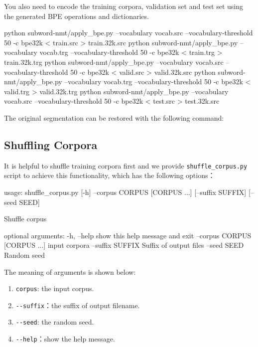 \documentclass{article}
\begin{document}
You also need to encode the training corpora, validation set and test set using the generated BPE operations and dictionaries.
\begin{everbatim}
  python subword-nmt/apply_bpe.py
    --vocabulary vocab.src
    --vocabulary-threshold 50
    -c bpe32k < train.src > train.32k.src
  python subword-nmt/apply_bpe.py
    --vocabulary vocab.trg
    --vocabulary-threshold 50
    -c bpe32k < train.trg > train.32k.trg
  python subword-nmt/apply_bpe.py
    --vocabulary vocab.src
    --vocabulary-threshold 50
    -c bpe32k < valid.src > valid.32k.src
  python subword-nmt/apply_bpe.py
    --vocabulary vocab.trg --vocabulary-threshold 50
    -c bpe32k < valid.trg > valid.32k.trg
  python subword-nmt/apply_bpe.py
    --vocabulary vocab.src
    --vocabulary-threshold 50
    -c bpe32k < test.src > test.32k.src
\end{everbatim}
The original segmentation can be restored with the following command:


\subsection{Shuffling Corpora}
It is helpful to shuffle training corpora first and we provide \verb|shuffle_corpus.py| script to achieve this functionality, which has the following options：
\begin{everbatim}
usage: shuffle_corpus.py [-h] --corpus CORPUS [CORPUS ...]
                         [--suffix SUFFIX]
                         [--seed SEED]

Shuffle corpus

optional arguments:
  -h, --help            show this help message and exit
  --corpus CORPUS [CORPUS ...]
                        input corpora
  --suffix SUFFIX       Suffix of output files
  --seed SEED           Random seed
\end{everbatim}

The meaning of arguments is shown below:
\begin{enumerate}
\item \verb|corpus|: the input corpus.
\item \verb|--suffix|：the suffix of output filename.
\item \verb|--seed|: the random seed.
\item \verb|--help|：show the help message.
\end{enumerate}
\end{document}
